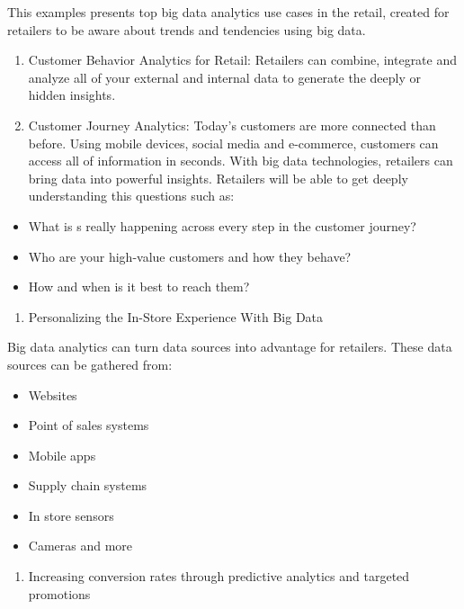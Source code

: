 \documentclass[]{book}
\providecommand{\tightlist}{%
  \setlength{\itemsep}{0pt}\setlength{\parskip}{0pt}}
\begin{document}
This examples presents top big data analytics use cases in the retail,
created for retailers to be aware about trends and tendencies using big
data.

\begin{enumerate}
\def\labelenumi{\arabic{enumi}.}
\item
  Customer Behavior Analytics for Retail: Retailers can combine,
  integrate and analyze all of your external and internal data to
  generate the deeply or hidden insights.
\item
  Customer Journey Analytics: Today's customers are more connected than
  before. Using mobile devices, social media and e-commerce, customers
  can access all of information in seconds. With big data technologies,
  retailers can bring data into powerful insights. Retailers will be
  able to get deeply understanding this questions such as:
\end{enumerate}

\begin{itemize}
\tightlist
\item
  What is s really happening across every step in the customer journey?
\item
  Who are your high-value customers and how they behave?
\item
  How and when is it best to reach them?
\end{itemize}

\begin{enumerate}
\def\labelenumi{\arabic{enumi}.}
\setcounter{enumi}{2}
\tightlist
\item
  Personalizing the In-Store Experience With Big Data
\end{enumerate}

Big data analytics can turn data sources into advantage for retailers.
These data sources can be gathered from:

\begin{itemize}
\tightlist
\item
  Websites
\item
  Point of sales systems
\item
  Mobile apps
\item
  Supply chain systems
\item
  In store sensors
\item
  Cameras and more
\end{itemize}

\begin{enumerate}
\def\labelenumi{\arabic{enumi}.}
\setcounter{enumi}{3}
\tightlist
\item
  Increasing conversion rates through predictive analytics and targeted
  promotions
\end{enumerate}
\end{document}
